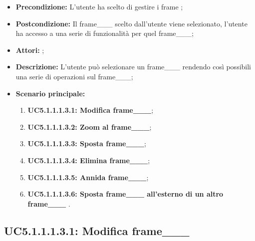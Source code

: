 \begin{itemize}
	\item \textbf{Precondizione:} L'utente ha scelto di gestire i frame ;
	\item \textbf{Postcondizione:} Il frame___ scelto dall'utente viene selezionato, l'utente ha accesso a una serie di funzionalità per quel frame___;
	\item \textbf{Attori:} ;
	\item \textbf{Descrizione:} L'utente può selezionare un frame___ rendendo così possibili una serie di operazioni sul frame___;
	\item \textbf{Scenario principale:}
	\begin{enumerate}
		\item \textbf{ UC5.1.1.1.3.1: Modifica frame___};
		\item \textbf{ UC5.1.1.1.3.2: Zoom al frame___};
		\item \textbf{ UC5.1.1.1.3.3: Sposta frame___};
		\item \textbf{ UC5.1.1.1.3.4: Elimina frame___};
		\item \textbf{ UC5.1.1.1.3.5: Annida frame___};
		\item \textbf{ UC5.1.1.1.3.6: Sposta frame___ all'esterno di un altro frame___  }.
	\end{enumerate}
\end{itemize}
\subsection{ UC5.1.1.1.3.1: Modifica frame___}

